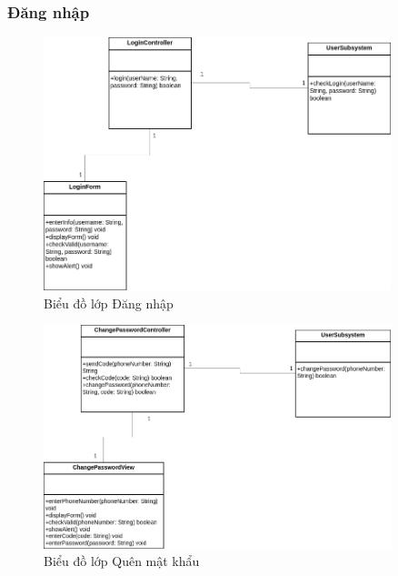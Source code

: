 \subsubsection{Đăng nhập}
\begin{figure}[H]
    \centering
    \includegraphics[width=0.9\textwidth]{img3.4.2/Design_diagram-Lớp đăng nhập.drawio.png} 
    \caption{Biểu đồ lớp Đăng nhập}
\end{figure}

\begin{figure}[H]
    \centering
    \includegraphics[width=0.9\textwidth]{img3.4.2/Design_diagram-Lớp quên mật khẩu.drawio.png} 
    \caption{Biểu đồ lớp Quên mật khẩu}
\end{figure}

